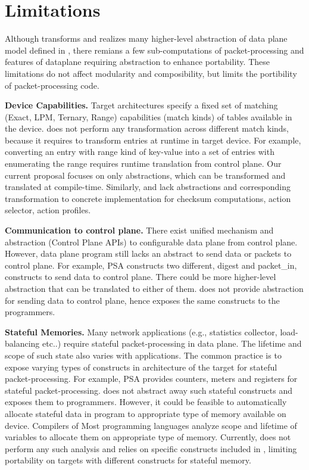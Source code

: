 \documentclass[letterpaper,twocolumn,10pt]{article}
\begin{document}
\section{Limitations}
\label{section:limitations}
Although \ucomp transforms and realizes many higher-level abstraction of data plane model defined in \uarch, there remians a few sub-computations of packet-processing and features of dataplane requiring abstraction to enhance portability.
These limitations do not affect modularity and composibility, but limits the portibility of packet-processing code.

\textbf{Device Capabilities.}
Target architectures specify a fixed set of matching (Exact, LPM, Ternary, Range) capabilities (match kinds) of tables available in the device.
\ucomp does not perform any transformation across different match kinds, because it requires to transform entries at runtime in target device. 
For example, converting an entry with range kind of key-value into a set of entries with enumerating the range requires runtime translation from control plane.
Our current proposal focuses on only abstractions, which can be transformed and translated at compile-time.
Similarly, \uarch and \ucomp lack abstractions and corresponding transformation to concrete implementation for checksum computations, action selector, action profiles.

\textbf{Communication to control plane.}
There exist unified mechanism and abstraction (Control Plane APIs) to configurable data plane from control plane.
However, data plane program still lacks an abstract to send data or packets to control plane.
For example, PSA constructs two different, digest and packet\_in, constructs to send data to control plane.
There could be more higher-level abstraction that can be translated to either of them.
\uarch does not provide abstraction for sending data to control plane, hence exposes the same constructs to the programmers.

\textbf{Stateful Memories.}
Many network applications (e.g., statistics collector, load-balancing etc..) require stateful packet-processing in data plane. 
The lifetime and scope of such state also varies with applications.
The common practice is to expose varying types of constructs in architecture of the target for stateful packet-processing.
For example, PSA provides counters, meters and registers for stateful packet-processing.
\uarch does not abstract away such stateful constructs and exposes them to programmers.
However, it could be feasible to automatically allocate stateful data in program to appropriate type of memory available on device.
Compilers of Most programming languages analyze scope and lifetime of variables to allocate them on appropriate type of memory.
Currently, \ucomp does not perform any such analysis and relies on specific constructs included in \uarch, limiting portability on targets with different constructs for stateful memory.
\end{document}
